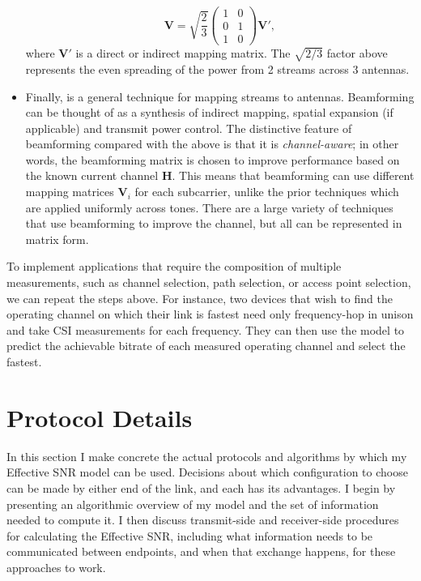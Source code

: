 \begin{itemize}[leftmargin=0.5cm,parsep=1ex,itemsep=1ex,topsep=1ex]
	\begin{equation*}
		\tag{$3$x$2$ Spatial Expansion}
		\mathbf{V} = \sqrt{\frac{2}{3}}\begin{pmatrix}
		1 & 0\\
		0 & 1\\
		1 & 0
		\end{pmatrix}\mathbf{V}',
	\end{equation*}
	where $\mathbf{V}'$ is a direct or indirect mapping matrix. The $\sqrt{2/3}$ factor above represents the even spreading of the power from 2 streams across 3 antennas.
%
	\item Finally,  is a general technique for mapping streams to antennas. Beamforming can be thought of as a synthesis of indirect mapping, spatial expansion (if applicable) and transmit power control. The distinctive feature of beamforming compared with the above is that it is \emph{channel-aware}; in other words, the beamforming matrix is chosen to improve performance based on the known current channel $\mathbf{H}$. This means that beamforming can use different mapping matrices $\mathbf{V}_i$ for each subcarrier, unlike the prior techniques which are applied uniformly across tones. There are a large variety of techniques that use beamforming to improve the channel, but all can be represented in matrix form.
\end{itemize}

 To implement applications that require the composition of multiple measurements, such as channel selection, path selection, or access point selection, we can repeat the steps above. For instance, two devices that wish to find the operating channel on which their link is fastest need only frequency-hop in unison and take CSI measurements for each frequency. They can then use the model to predict the achievable bitrate of each measured operating channel and select the fastest.

\section{Protocol Details}
\label{sec:model_protocol}

In this section I make concrete the actual protocols and algorithms by which my Effective SNR model can be used. Decisions about which configuration to choose can be made by either end of the link, and each has its advantages. I begin by presenting an algorithmic overview of my model and the set of information needed to compute it. I then discuss transmit-side and receiver-side procedures for calculating the Effective SNR, including what information needs to be communicated between endpoints, and when that exchange happens, for these approaches to work.


